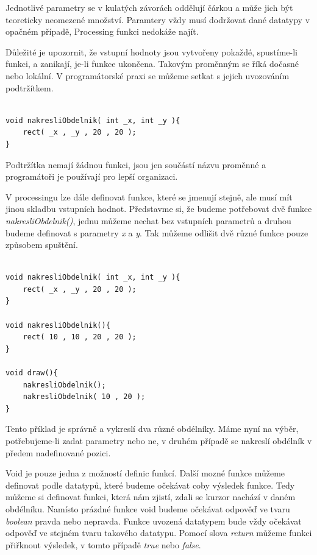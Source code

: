 \documentclass[10pt]{book}
\newcommand{\vyraz}[1]{\textit{\gls{#1}}\index{#1}\label{#1}}
\begin{document}
Jednotlivé parametry se v kulatých závorách oddělují čárkou a může jich být teoreticky neomezené množství. Paramtery vždy musí dodržovat dané datatypy v opačném případě, Processing funkci nedokáže najít.

Důležité je upozornit, že vstupní hodnoty jsou vytvořeny pokaždé, spustíme-li funkci, a zanikají, je-li funkce ukončena. Takovým proměnným se říká dočasné nebo lokální. V programátorské praxi se můžeme setkat s jejich uvozováním podtržítkem.


\begin{lstlisting}

void nakresliObdelnik( int _x, int _y ){
	rect( _x , _y , 20 , 20 );
}

\end{lstlisting}

Podtržítka nemají žádnou funkci, jsou jen součástí názvu proměnné a programátoři je používají pro lepší organizaci.

V processingu lze dále definovat funkce, které se jmenují stejně, ale musí mít jinou skladbu vstupních hodnot. Představme si, že budeme potřebovat dvě funkce {\em nakresliObdelnik()}, jednu můžeme nechat bez vstupních parametrů a druhou budeme definovat s parametry {\em x} a {\em y}. Tak můžeme odlišit dvě různé funkce pouze způsobem spuštění.


\begin{lstlisting}

void nakresliObdelnik( int _x, int _y ){
	rect( _x , _y , 20 , 20 );
}

void nakresliObdelnik(){
	rect( 10 , 10 , 20 , 20 );
}

void draw(){
	nakresliObdelnik();
	nakresliObdelnik( 10 , 20 );
}

\end{lstlisting}

Tento příklad je správně a vykreslí dva různé obdélníky. Máme nyní na výběr, potřebujeme-li zadat parametry nebo ne, v druhém případě se nakreslí obdélník v předem nadefinované pozici.


Void je pouze jedna z možností definic funkcí. Další mozné funkce můžeme definovat podle datatypů, které budeme očekávat coby výsledek funkce. Tedy můžeme si definovat funkci, která nám zjistí, zdali se kurzor nachází v daném obdélníku. Namísto prázdné funkce void budeme očekávat odpověď ve tvaru \vyraz{boolean} pravda nebo nepravda. Funkce uvozená datatypem bude vždy očekávat odpověď ve stejném tvaru takového datatypu. Pomocí slova \vyraz{return} můžeme funkci přiřknout výsledek, v tomto případě \vyraz{true} nebo \vyraz{false}.
\end{document}
